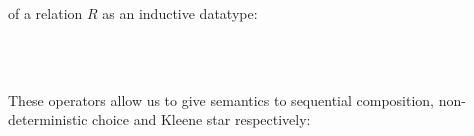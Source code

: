 \documentclass[sigplan]{acmart}%
\begin{document}
of a relation $R$ as an inductive datatype:
\begin{code}
\>[2]\AgdaSpace{}%
\AgdaSpace{}%
\AgdaSymbol{(}\AgdaSpace{}%
\AgdaSymbol{:}\AgdaSpace{}%
\AgdaSymbol{)}\AgdaSpace{}%
\AgdaSymbol{:}\AgdaSpace{}%
\AgdaSpace{}%
\<%
\\
\>[2][@{}l@{\AgdaIndent{0}}]%
\>[4]\AgdaSpace{}%
\AgdaSymbol{:}\AgdaSpace{}%
\AgdaSymbol{(}\AgdaSpace{}%
\AgdaSymbol{)}\AgdaSpace{}%
\AgdaSpace{}%
\<%
\\
%
\>[4]\AgdaSpace{}%
\AgdaSymbol{:}\AgdaSpace{}%
\AgdaSpace{}%
\AgdaSpace{}%
\AgdaSpace{}%
\AgdaSpace{}%
\AgdaSymbol{(}\AgdaSpace{}%
\AgdaSymbol{)}\AgdaSpace{}%
\AgdaSpace{}%
\AgdaSpace{}%
\AgdaSpace{}%
\AgdaSymbol{(}\AgdaSpace{}%
\AgdaSymbol{)}\AgdaSpace{}%
\AgdaSpace{}%
\<%
\end{code}
These operators allow us to give semantics to sequential composition,
non-deterministic choice and Kleene star respectively:
\end{document}
